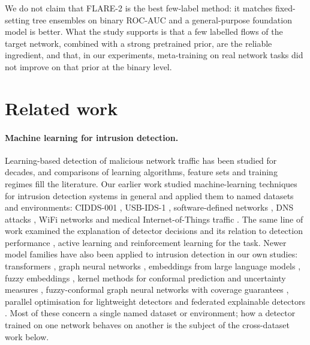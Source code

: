 \documentclass[11pt]{article}
\begin{document}
We do not claim that FLARE-2 is the best few-label method: it matches fixed-setting tree ensembles on binary ROC-AUC and a general-purpose foundation model is better.
What the study supports is that a few labelled flows of the target network, combined with a strong pretrained prior, are the reliable ingredient, and that, in our experiments, meta-training on real network tasks did not improve on that prior at the binary level.

\section{Related work}
\paragraph{Machine learning for intrusion detection.}
Learning-based detection of malicious network traffic has been studied for decades, and comparisons of learning algorithms, feature sets and training regimes fill the literature.
Our earlier work studied machine-learning techniques for intrusion detection systems in general \citep{dang2019studying,dang2022cai,dang2022mlids} and applied them to named datasets and environments: CIDDS-001 \citep{dang2021cidds,dang2022cidds}, USB-IDS-1 \citep{dang2023usbmulti}, software-defined networks \citep{dang2021sdn,dang2024fuzzy}, DNS attacks \citep{dang2022dns,dang2021fuzzydns}, WiFi networks \citep{dang2023wifi} and medical Internet-of-Things traffic \citep{dang2024iomt}.
The same line of work examined the explanation of detector decisions and its relation to detection performance \citep{dang2020understand,dang2021explain}, active learning \citep{dang2020active} and reinforcement learning \citep{dang2022rl} for the task.
Newer model families have also been applied to intrusion detection in our own studies: transformers \citep{dang2023transformer}, graph neural networks \citep{dang2023wifi}, embeddings from large language models \citep{dang2025llm}, fuzzy embeddings \citep{dang2024fuzzy}, kernel methods for conformal prediction and uncertainty measures \citep{dang2024conformal,dang2026uncertainty}, fuzzy-conformal graph neural networks with coverage guarantees \citep{dang2026fcgnn}, parallel optimisation for lightweight detectors \citep{dang2024lightweight} and federated explainable detectors \citep{dang2026stfedxids}.
Most of these concern a single named dataset or environment; how a detector trained on one network behaves on another is the subject of the cross-dataset work below.
\end{document}
